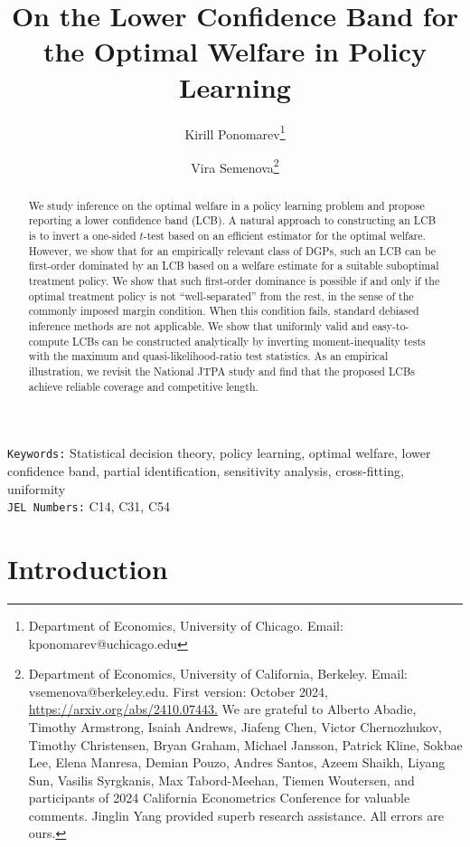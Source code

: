 \documentclass[12pt]{article}
\title{On the Lower Confidence Band for the Optimal Welfare in Policy Learning }
\author{ Kirill Ponomarev\thanks{Department of Economics, University of Chicago. Email: kponomarev@uchicago.edu} \and 	Vira Semenova\thanks{Department of Economics, University of California, Berkeley. Email: vsemenova@berkeley.edu. \newline
First version: October 2024, \href{https://arxiv.org/abs/2410.07443}{https://arxiv.org/abs/2410.07443.}  We are grateful to Alberto Abadie, Timothy Armstrong, Isaiah Andrews, Jiafeng  Chen, Victor Chernozhukov, Timothy Christensen, Bryan Graham, Michael Jansson, Patrick Kline, Sokbae Lee, Elena Manresa, Demian Pouzo, Andres Santos, Azeem Shaikh, Liyang  Sun, Vasilis Syrgkanis, Max Tabord-Meehan, Tiemen Woutersen, and participants of 2024 California Econometrics Conference for valuable comments. Jinglin Yang provided superb research assistance. All errors are ours.
}  }
\numberwithin{equation}{section}
\theoremstyle{plain}                         %
\theoremstyle{definition}                  %
\theoremstyle{remark}                      %
\begin{document}
\maketitle


\begin{abstract}


We study inference on the optimal welfare in a policy learning problem and propose reporting a lower confidence band (LCB). A natural approach to constructing an LCB is to invert a one-sided $t$-test based on an efficient estimator for the optimal welfare. However, we show that for an empirically relevant class of DGPs, such an LCB can be first-order dominated by an LCB based on a welfare estimate for a suitable suboptimal treatment policy. We show that such first-order dominance is possible if and only if the optimal treatment policy is not ``well-separated'' from the rest, in the sense of the commonly imposed margin condition. When this condition fails, standard debiased inference methods are not applicable. We show that uniformly valid and easy-to-compute LCBs can be constructed analytically by inverting moment-inequality tests with the maximum and quasi-likelihood-ratio test statistics. As an empirical illustration, we revisit the National JTPA study and find that the proposed LCBs achieve reliable coverage and competitive length. 
  \end{abstract}
  \maketitle
\noindent\texttt{Keywords:}  Statistical decision theory, policy learning, optimal welfare, lower confidence band, partial identification, sensitivity analysis, cross-fitting,  uniformity \\
\noindent\texttt{JEL Numbers:} C14, C31, C54






\newpage






\section{Introduction}

\end{document}
